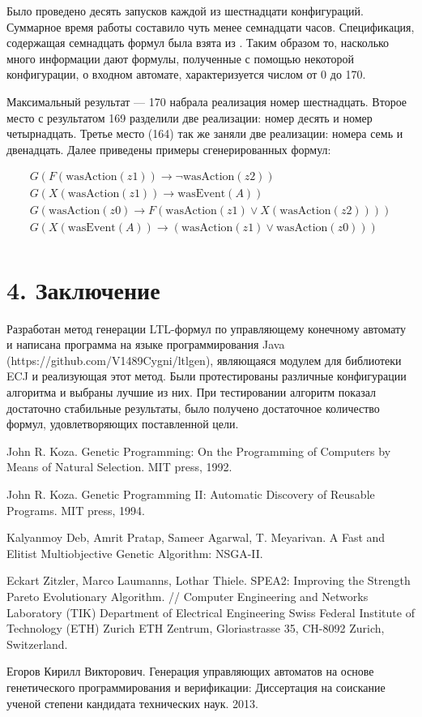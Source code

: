 \documentclass[12pt,fleqn]{article}
\begin{document}
Было проведено десять запусков каждой из шестнадцати конфигураций. Суммарное время работы составило чуть менее семнадцати часов.
Спецификация, содержащая семнадцать формул была взята из \cite{eg}.
Таким образом то, насколько много информации дают формулы, полученные с помощью некоторой конфигурации, о входном автомате,
характеризуется числом от 0 до 170.

Максимальный результат --- 170 набрала реализация номер шестнадцать. Второе место с результатом 169 разделили две реализации:
номер десять и номер четырнадцать. Третье место (164) так же заняли две реализации: номера семь и двенадцать.
Далее приведены примеры сгенерированных формул: 

\begin{multline*}
G(F(\text{wasAction}(z1)) \rightarrow \lnot \text{wasAction}(z2))\\
G(X(\text{wasAction}(z1)) \rightarrow \text{wasEvent}(A))\\
G(\text{wasAction}(z0) \rightarrow F(\text{wasAction}(z1) \vee X(\text{wasAction}(z2))))\\
G(X(\text{wasEvent}(A)) \rightarrow (\text{wasAction}(z1) \vee \text{wasAction}(z0)))\\
\end{multline*}

\section{4. Заключение}

Разработан метод генерации LTL-формул по управляющему конечному автомату и написана программа на языке программирования Java
(https://github.com/V1489Cygni/ltlgen), являющаяся модулем для библиотеки ECJ и реализующая этот метод.
Были протестированы различные конфигурации алгоритма и выбраны лучшие из них. При тестировании алгоритм показал
достаточно стабильные результаты, было получено достаточное количество формул, удовлетворяющих поставленной цели.

\begin{thebibliography}{5}

John R. Koza. Genetic Programming: On the Programming of Computers by Means of Natural Selection. MIT press, 1992.

John R. Koza. Genetic Programming II: Automatic Discovery of Reusable Programs. MIT press, 1994.

Kalyanmoy Deb, Amrit Pratap, Sameer Agarwal, T. Meyarivan. A Fast and Elitist Multiobjective Genetic Algorithm: NSGA-II.

Eckart Zitzler, Marco Laumanns, Lothar Thiele. SPEA2: Improving the Strength Pareto Evolutionary Algorithm. //
Computer Engineering and Networks Laboratory (TIK)
Department of Electrical Engineering
Swiss Federal Institute of Technology (ETH) Zurich
ETH Zentrum, Gloriastrasse 35, CH-8092 Zurich, Switzerland.

Егоров Кирилл Викторович. Генерация управляющих автоматов на основе генетического программирования и верификации: 
Диссертация на соискание ученой степени кандидата технических наук. 2013.   

\end{thebibliography}
\end{document}
